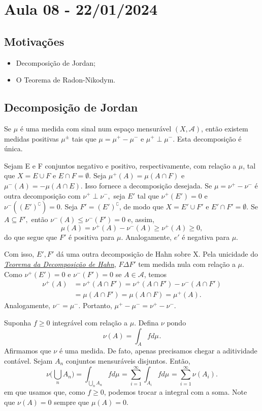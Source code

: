\documentclass[measure_theory.tex]{subfiles}
\begin{document}
\section{Aula 08 - 22/01/2024}
\subsection{Motivações}
\begin{itemize}
	\item Decomposição de Jordan;
	\item O Teorema de Radon-Nikodym.
\end{itemize}
\subsection{Decomposição de Jordan}
\hypertarget{jordan_decomposition}{
	\begin{theorem*}
		Se \(\mu \) é uma medida com sinal num espaço mensurável \((X, \mathcal{A})\), então existem medidas positivas \(\mu ^{\pm}\) tais que \(\mu = \mu ^{+} - \mu ^{-}\) e \(\mu ^{+}\perp \mu ^{-}.\) Esta decomposição é única.
	\end{theorem*}}
\begin{proof*}
	Sejam E e F conjuntos negativo e positivo, respectivamente, com relação a \(\mu \), tal que \(X = E\cup F\) e \(E\cap F = \emptyset \). Seja \(\mu ^{+}(A) = \mu (A\cap F)\) e \(\mu ^{-}(A)=-\mu (A\cap E).\) Isso
	fornece a decomposição desejada. Se \(\mu = \nu^{+}-\nu^{-}\) é outra decomposição com \(\nu^{+}\perp \nu^{-},\) seja \(E'\) tal que \(\nu^{+}(E') = 0\) e
	\(\nu^{-}((E')^{\complement}) = 0.\) Seja \(F'=(E')^{\complement}\), de modo que \(X = E' \cup F'\) e \(E'\cap F' = \emptyset \). Se \(A\subseteq F',\) então \(\nu^{-}(A)\leq \nu^{-}(F') = 0\) e, assim,
	\[
		\mu (A) = \nu ^{+}(A) - \nu ^{-}(A) \geq \nu ^{+}(A) \geq 0,
	\]
	do que segue que \(F'\) é positiva para \(\mu \). Analogamente, \(e'\) é negativa para \(\mu .\)

	Com isso, \(E', F'\) dá uma outra decomposição de Hahn sobre X. Pela unicidade do \hyperlink{hahn}{\textit{Teorema da Decomposição de Hahn}}, \(F\Delta F'\) tem medida nula com relação a \(\mu \). Como \(\nu ^{+}(E') = 0\) e \(\nu^{-}(F') = 0\)
	se \(A\in \mathcal{A}\), temos
	\begin{align*}
		\nu ^{+}(A) & = \nu ^{+}(A\cap F') = \nu ^{+}(A\cap F') - \nu ^{-}(A\cap F') \\
		            & = \mu (A\cap F') = \mu (A\cap F) = \mu ^{+}(A).
	\end{align*}
	Analogamente, \(\nu^{-}=\mu ^{-}.\) Portanto, \(\mu^{+}-\mu ^{-}= \nu^{+}-\nu ^{-}. \) \qedsymbol
\end{proof*}
Suponha \(f\geq 0\) integrável com relação a \(\mu \). Defina \(\nu \) pondo
\[
	\nu (A) = \int_{A}f d\mu_{}.
\]
Afirmamos que \(\nu \) é uma medida. De fato, apenas precisamos chegar a aditividade contável. Sejam \(A_{n}\) conjuntos mensuráveis disjuntos. Então,
\[
	\nu \biggl(\bigcup_{n}^{}A_{n}\biggr) = \int_{\bigcup_{n}^{}A_{n}}f d\mu_{} = \sum\limits_{i=1}^{\infty}\int_{A_{i}}f d\mu_{} = \sum\limits_{i=1}^{\infty}\nu (A_{i}).
\]
em que usamos que, como \(f\geq 0\), podemos trocar a integral com a soma. Note que \(\nu (A) = 0\) sempre que \(\mu (A) = 0\).
\end{document}
